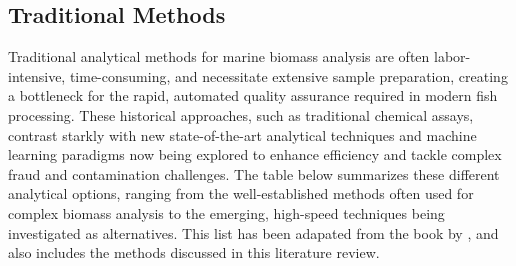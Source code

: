 \subsection{Traditional Methods}

Traditional analytical methods for marine biomass analysis are often labor-intensive, time-consuming, and necessitate extensive sample preparation, creating a bottleneck for the rapid, automated quality assurance required in modern fish processing. These historical approaches, such as traditional chemical assays, contrast starkly with new state-of-the-art analytical techniques and machine learning paradigms now being explored to enhance efficiency and tackle complex fraud and contamination challenges. The table below summarizes these different analytical options, ranging from the well-established methods often used for complex biomass analysis to the emerging, high-speed techniques being investigated as alternatives. This list has been adapated from the book by \cite{Vaz2016}, and also includes the methods discussed in this literature review.


